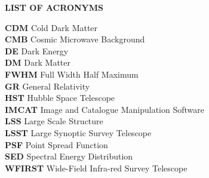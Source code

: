 \documentclass[12pt, preprint,letterpaper]{article}
\begin{document}
%
\thispagestyle{empty}
\begin{center}
\textbf{LIST OF ACRONYMS}
\end{center}
\textbf{CDM}    \hspace{9.5mm} Cold Dark Matter \\
\textbf{CMB}    \hspace{10mm} Cosmic Microwave Background \\
\textbf{DE}     \hspace{15mm} Dark Energy \\
\textbf{DM}     \hspace{14mm} Dark Matter \\
\textbf{FWHM}   \hspace{6mm} Full Width Half Maximum \\
\textbf{GR}     \hspace{15mm} General Relativity \\
\textbf{HST}    \hspace{13mm} Hubble Space Telescope \\
\textbf{IMCAT}  \hspace{7mm} Image and Catalogue Manipulation Software \\
\textbf{LSS}    \hspace{15mm} Large Scale Structure \\
\textbf{LSST}   \hspace{12mm} Large Synoptic Survey Telescope \\
\textbf{PSF}    \hspace{14mm} Point Spread Function \\
\textbf{SED}    \hspace{14mm} Spectral Energy Distribution \\
\textbf{WFIRST} \hspace{4mm}  Wide-Field Infra-red Survey Telescope \\

\newpage
%
%
%
%
\end{document}
